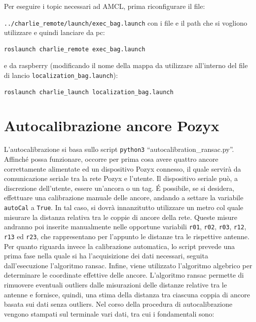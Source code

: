 Per eseguire i topic necessari ad AMCL, prima riconfigurare il file:

\verb|../charlie_remote/launch/exec_bag.launch| con i file e il path che si vogliono utilizzare e quindi lanciare da pc:
\begin{lstlisting}[style=bashPC]
	roslaunch charlie_remote exec_bag.launch
\end{lstlisting}
e da raspberry (modificando il nome della mappa da utilizzare all'interno del file di lancio \verb|localization_bag.launch|):
\begin{lstlisting}[style=bash]
	roslaunch charlie_launch localization_bag.launch
\end{lstlisting}

\newpage
\appendix
\section{Autocalibrazione ancore Pozyx}
\label{sez:Autocalibrazione}
L'autocalibrazione si basa sullo script \texttt{python3} ``autocalibration\_ransac.py''. 
Affinché possa funzionare, occorre per prima cosa avere quattro ancore correttamente alimentate ed un dispositivo Pozyx connesso, il quale servirà da comunicazione seriale tra la rete Pozyx e l’utente. 
Il dispositivo seriale può, a discrezione dell’utente, essere un’ancora o un tag. 
É possibile, se si desidera, effettuare una calibrazione manuale delle ancore, andando a settare la variabile \verb|autoCal| a \verb|True|. 
In tal caso, si dovrà innanzitutto utilizzare un metro col quale misurare la distanza relativa tra le coppie di ancore della rete. Queste misure andranno poi inserite manualmente  nelle opportune variabili \texttt{r01}, \texttt{r02}, \texttt{r03}, \texttt{r12}, \texttt{r13} ed \texttt{r23}, che rappresentano per l'appunto le distanze tra le rispettive antenne.
Per quanto riguarda invece la calibrazione automatica, lo script prevede una prima fase nella quale si ha l'acquisizione dei dati necessari, seguita dall'esecuzione l’algoritmo ransac. Infine, viene utilizzato l’algoritmo algebrico per determinare le coordinate effettive delle ancore. 
L’algoritmo ransac permette di rimuovere eventuali outliers dalle misurazioni delle distanze relative tra le antenne e fornisce, quindi, una stima della distanza tra ciascuna coppia di ancore basata sui dati senza outliers.
Nel corso della procedura di autocalibrazione vengono stampati sul terminale vari dati, tra cui i fondamentali sono:
